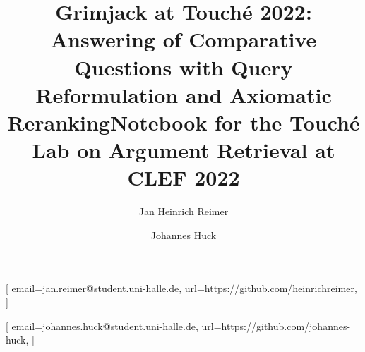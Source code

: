 \documentclass[
]{ceurart}
\begin{document}


\title{Grimjack at Touché 2022:\\ Answering of Comparative Questions with Query Reformulation and Axiomatic Reranking}
\title[mode=sub]{Notebook for the Touch{\'e} Lab on Argument Retrieval at CLEF 2022}

\author[1]{Jan Heinrich Reimer}[%
email=jan.reimer@student.uni-halle.de,
url=https://github.com/heinrichreimer,
]
\address[1]{Martin-Luther-University Halle-Wittenberg,
Universitätsplatz 10, Halle, 06108, Germany}

\author[1]{Johannes Huck}[%
email=johannes.huck@student.uni-halle.de,
url=https://github.com/johannes-huck,
]



\maketitle








\end{document}
